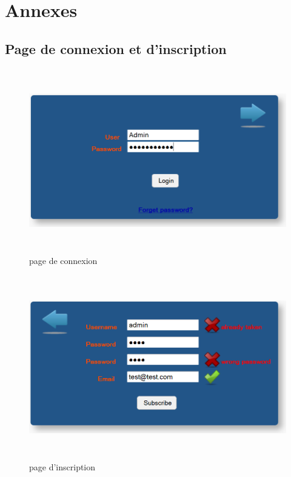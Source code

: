 \newpage
\chapter*{Annexes}

\setcounter{page}{1}




\section{Page de connexion et d'inscription}
\label{annexe/espace_nom}

\begin{figure}[!h]
	\begin{center}
		\includegraphics[width=16cm,height=8cm]{login.png}	
		\caption{page de connexion}
	\end{center}
\end{figure}

\begin{figure}[!h]
	\begin{center}
		\includegraphics[width=16cm,height=8cm]{subscribe.png}
		\caption{page d'inscription}
	\end{center}
\end{figure}

